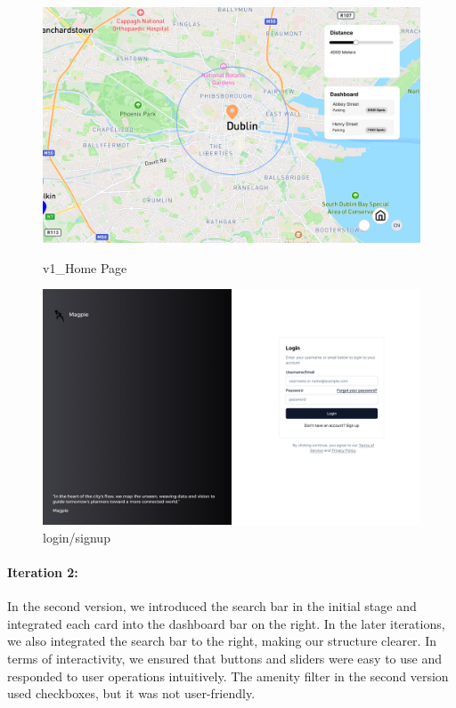 \begin{figure}[h]
    \centering
    \begin{minipage}{0.48\textwidth}
        \centering
        \includegraphics[width=\textwidth]{images/v1_Home Page.png}
        \caption{v1\_Home Page}
        \label{fig:v1_Home Page}
    \end{minipage}
    \hfill
    \begin{minipage}{0.48\textwidth}
        \centering
        \includegraphics[width=\textwidth]{images/v1_Login.png}
        \caption{login/signup}
        \label{fig:v1 Login}
    \end{minipage}
\end{figure}


\paragraph{Iteration 2:}
In the second version, we introduced the search bar in the initial stage and integrated each card into the dashboard bar on the right. In the later iterations, we also integrated the search bar to the right, making our structure clearer. In terms of interactivity, we ensured that buttons and sliders were easy to use and responded to user operations intuitively. The amenity filter in the second version used checkboxes, but it was not user-friendly.


